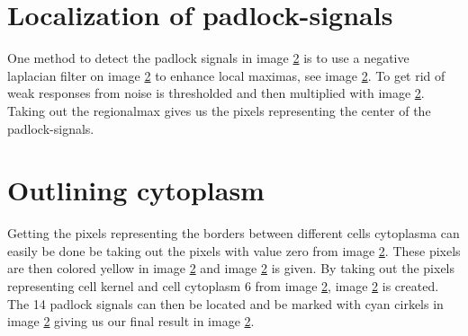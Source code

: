 \documentclass[10pt,twocolumn]{article}
\begin{document}
\section{Localization of padlock-signals}
One method to detect the padlock signals in image \ref{} is to use a negative
laplacian filter on image \ref{} to enhance local maximas, see image \ref{}.
To get rid of weak responses from noise \image{} is thresholded and then multiplied with image \ref{}.
Taking out the regionalmax gives us the pixels representing the center of the padlock-signals.

\section{Outlining cytoplasm}
Getting the pixels representing the borders between different cells cytoplasma can
easily be done be taking out the pixels with value zero from image \ref{}.
These pixels are then colored yellow in image \ref{} and image \ref{} is given.
By taking out the pixels representing cell kernel and cell cytoplasm 6 from image
\ref{}, image \ref{} is created. The 14 padlock signals can then be located and
be marked with cyan cirkels in image \ref{} giving us our final result in image \ref{}.
\end{document}
